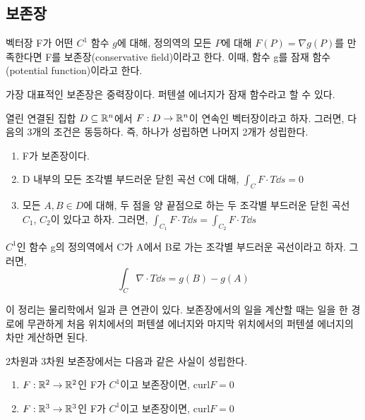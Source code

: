 \subsection{보존장}
\begin{definition}[보존장]
벡터장 F가 어떤 $C^1$ 함수 $g$에 대해, 정의역의 모든 $P$에 대해 $F(P)=\nabla g(P)$를 만족한다면 F를 보존장(conservative field)이라고 한다. 이때, 함수 g를 잠재 함수(potential function)이라고 한다.
\end{definition}
가장 대표적인 보존장은 중력장이다. 퍼텐셜 에너지가 잠재 함수라고 할 수 있다.
\begin{theorem}
열린 연결된 집합 $D\subseteq\mathbb{R}^n$에서 $F:D\to\mathbb{R}^n$이 연속인 벡터장이라고 하자. 그러면, 다음의 3개의 조건은 동등하다. 즉, 하나가 성립하면 나머지 2개가 성립한다.
\begin{enumerate}[label=(\alph*)]
    \item F가 보존장이다.
    \item D 내부의 모든 조각별 부드러운 닫힌 곡선 C에 대해, $\int_C F\cdot T\dd s = 0$
    \item 모든 $A,B \in D$에 대해, 두 점을 양 끝점으로 하는 두 조각별 부드러운 닫힌 곡선 $C_1$, $C_2$이 있다고 하자. 그러면, $\int_{C_1}F\cdot T\dd s = \int_{C_2}F\cdot T\dd s$
\end{enumerate}
\end{theorem}
\begin{theorem}[선적분의 기본 정리]
$C^1$인 함수 g의 정의역에서 C가 A에서 B로 가는 조각별 부드러운 곡선이라고 하자. 그러면,
$$
\int_C \nabla \cdot T\dd s = g(B)-g(A)
$$
\end{theorem}
이 정리는 물리학에서 일과 큰 연관이 있다. 보존장에서의 일을 계산할 때는 일을 한 경로에 무관하게 처음 위치에서의 퍼텐셜 에너지와 마지막 위치에서의 퍼텐셜 에너지의 차만 게산하면 된다.
\begin{theorem}
2차원과 3차원 보존장에서는 다음과 같은 사실이 성립한다.
\begin{enumerate}[label=(\alph*)]
    \item $F:\mathbb{R}^2\to\mathbb{R}^2$인 F가 $C^1$이고 보존장이면, $\text{curl}F=0$
    \item $F:\mathbb{R}^3\to\mathbb{R}^3$인 F가 $C^1$이고 보존장이면, $\text{curl}F=0$
\end{enumerate}
\end{theorem}

